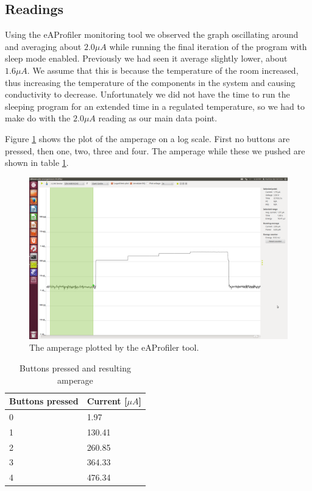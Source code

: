 \subsection{Readings}
Using the eAProfiler monitoring tool we observed the graph oscillating around and averaging about $2.0 \mu A$ while running the final iteration of the program with sleep mode enabled. Previously we had seen it average slightly lower, about $1.6 \mu A$. We assume that this is because the temperature of the room increased, thus increasing the temperature of the components in the system and causing conductivity to decrease. Unfortunately we did not have the time to run the sleeping program for an extended time in a regulated temperature, so we had to make do with the $2.0 \mu A$ reading as our main data point.

Figure \ref{fig:ampsplot} shows the plot of the amperage on a log scale. First no buttons are pressed, then one, two, three and four. The amperage while these we pushed are shown in table \ref{tbl:current}.

\begin{figure}[h!]
    \includegraphics[width=\linewidth]{img/0.png}
    \caption{The amperage plotted by the eAProfiler tool.}
    \label{fig:ampsplot}
\end{figure}
\begin{table}[h!]
    \begin{tabular}{l|l}
        Buttons pressed & Current [$\mu A$] \\
	\hline
	0               & 1.97              \\
	1               & 130.41            \\
        2               & 260.85            \\
	3               & 364.33            \\
	4               & 476.34
    \end{tabular}
    \caption{Buttons pressed and resulting amperage \label{tbl:current}}
\end{table}

